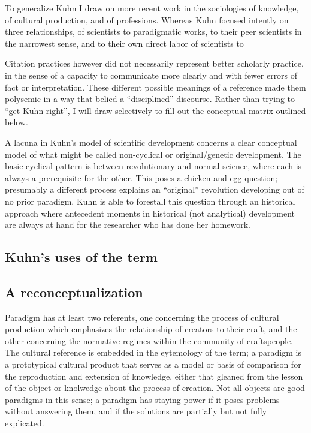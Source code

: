 \documentclass[]{article}
\begin{document}
To generalize Kuhn I draw on more recent work in the sociologies of
knowledge, of cultural production, and of professions. Whereas Kuhn
focused intently on three relationships, of scientists to paradigmatic
works, to their peer scientists in the narrowest sense, and to their own
direct labor of scientists to

Citation practices however did not necessarily represent better
scholarly practice, in the sense of a capacity to communicate more
clearly and with fewer errors of fact or interpretation. These different
possible meanings of a reference made them polysemic in a way that
belied a ``disciplined'' discourse. Rather than trying to ``get Kuhn
right'', I will draw selectively to fill out the conceptual matrix
outlined below.

A lacuna in Kuhn's model of scientific development concerns a clear
conceptual model of what might be called non-cyclical or
original/genetic development. The basic cyclical pattern is between
revolutionary and normal science, where each is always a prerequisite
for the other. This poses a chicken and egg question; presumably a
different process explains an ``original'' revolution developing out of
no prior paradigm. Kuhn is able to forestall this question through an
historical approach where antecedent moments in historical (not
analytical) development are always at hand for the researcher who has
done her homework.

\subsection{Kuhn's uses of the term}\label{kuhns-uses-of-the-term}

\subsection{A reconceptualization}\label{a-reconceptualization}

Paradigm has at least two referents, one concerning the process of
cultural production which emphasizes the relationship of creators to
their craft, and the other concerning the normative regimes within the
community of craftspeople. The cultural reference is embedded in the
eytemology of the term; a paradigm is a prototypical cultural product
that serves as a model or basis of comparison for the reproduction and
extension of knowledge, either that gleaned from the lesson of the
object or knolwedge about the process of creation. Not all objects are
good paradigms in this sense; a paradigm has staying power if it poses
problems without answering them, and if the solutions are partially but
not fully explicated.
\end{document}
